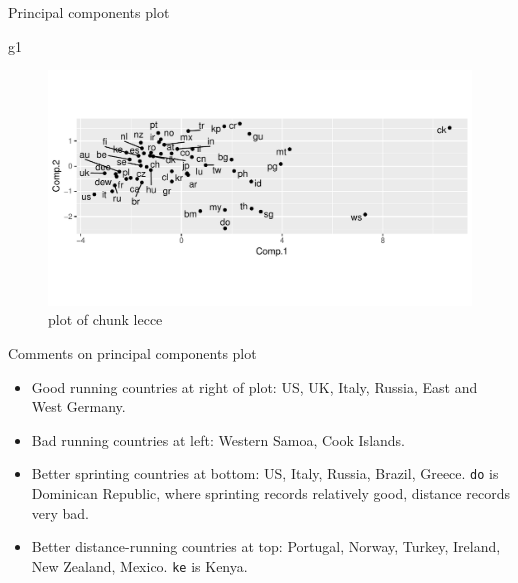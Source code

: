 \documentclass[ignorenonframetext,]{beamer}
\newenvironment{Shaded}{\begin{snugshade}}{\end{snugshade}}
\newcommand{\NormalTok}[1]{#1}
\begin{document}
\begin{frame}[fragile]{Principal components plot}
\protect\hypertarget{principal-components-plot}{}

\begin{Shaded}
\begin{Highlighting}[]
\NormalTok{g1}
\end{Highlighting}
\end{Shaded}

\begin{figure}
\centering
\includegraphics{figure/lecce-1.pdf}
\caption{plot of chunk lecce}
\end{figure}

\end{frame}

\begin{frame}[fragile]{Comments on principal components plot}
\protect\hypertarget{comments-on-principal-components-plot}{}

\begin{itemize}
\item
  Good running countries at right of plot: US, UK, Italy, Russia, East
  and West Germany.
\item
  Bad running countries at left: Western Samoa, Cook Islands.
\item
  Better sprinting countries at bottom: US, Italy, Russia, Brazil,
  Greece. \texttt{do} is Dominican Republic, where sprinting records
  relatively good, distance records very bad.
\item
  Better distance-running countries at top: Portugal, Norway, Turkey,
  Ireland, New Zealand, Mexico. \texttt{ke} is Kenya.
\end{itemize}

\end{frame}
\end{document}
